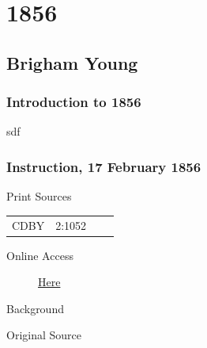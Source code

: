 \section{1856}

	\subsection{Brigham Young}
		\label{EMS-1856-BY}

		\subsubsection{Introduction to 1856}
		
			sdf
			
		\subsubsection{Instruction, 17 February 1856}
			\label{EMS-1856-BY-17-FEB-1856}
			
			\begin{description}
					\item[Print Sources]
				\end{description}

					\begin{tabular}{p{0.5in}p{1in}p{0.5in}p{1in}}
					CDBY	& 2:1052		&  		&  \\
					\end{tabular}
				
				\begin{description}
					\item[Online Access] \href{https://catalog.churchofjesuschrist.org/assets/03adc166-a80a-4aa7-b441-9f3f4fa0b7f1/0/0}{Here}
				\end{description}
				
				\begin{description}
					\item[Background]
				\end{description}
				
					\phantom{.}
				
				\begin{description}
					\item[Original Source]
				\end{description}
				
